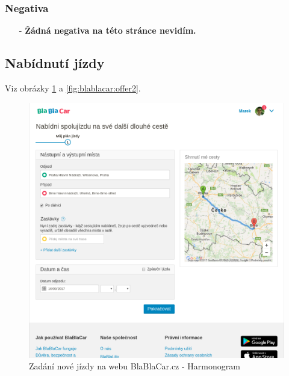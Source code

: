 \subsubsection*{Negativa}
\begin{itemize}
    \item[-] \textbf{Žádná negativa na této stránce nevidím.}
\end{itemize}



\newpage
\subsection{Nabídnutí jízdy}
Viz obrázky \ref{fig:blablacar:offer} a \ref{fig:blablacar:offer2}.
\begin{figure}[h]
    \centering
    \includegraphics[width=1.0\textwidth]{media/blablacar/offer.png}
    \caption{Zadání nové jízdy na webu BlaBlaCar.cz - Harmonogram}
    \label{fig:blablacar:offer}
\end{figure}
